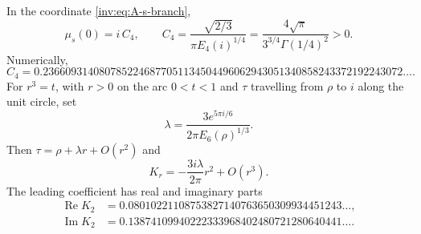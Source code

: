 \begin{proposition}\label{inv:A2.2}
In the coordinate \eqref{inv:eq:A-s-branch},
\begin{equation}\label{inv:eq:A-mu-value}
\mu_s(0)=i\,C_4,
\qquad
C_4=\frac{\sqrt{2/3}}{\pi E_4(i)^{1/4}}
=\frac{4\sqrt\pi}{3^{3/4}\Gamma(1/4)^2}>0.
\end{equation}
Numerically,
\[
C_4=0.2366093140807852246877051134504496062943051340858243372192243072\ldots.
\]
For $r^3=t$, with $r>0$ on the arc $0<t<1$ and $\tau$ travelling
from $\rho$ to $i$ along the unit circle, set
\[
\lambda=\frac{3e^{5\pi i/6}}{2\pi E_6(\rho)^{1/3}}.
\]
Then $\tau=\rho+\lambda r+O(r^2)$ and
\[
K_r=-\frac{3i\lambda}{2\pi}r^2+O(r^3).
\]
The leading coefficient has real and imaginary parts
\[
\begin{aligned}
\operatorname{Re}K_2&=0.08010221108753827140763650309934451243\ldots,\\
\operatorname{Im}K_2&=0.13874109940222333968402480721280640441\ldots.
\end{aligned}
\]
\end{proposition}

